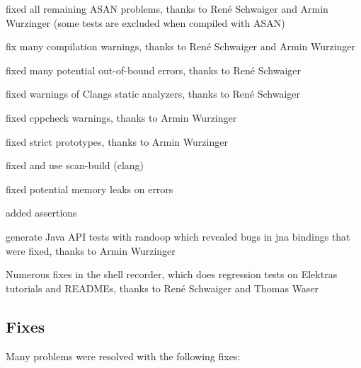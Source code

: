 \begin{DoxyItemize}
\item fixed all remaining A\+S\+AN problems, thanks to René Schwaiger and Armin Wurzinger (some tests are excluded when compiled with A\+S\+AN)
\item fix many compilation warnings, thanks to René Schwaiger and Armin Wurzinger
\item fixed many potential out-\/of-\/bound errors, thanks to René Schwaiger
\item fixed warnings of Clang\textquotesingle{}s static analyzers, thanks to René Schwaiger
\item fixed cppcheck warnings, thanks to Armin Wurzinger
\item fixed strict prototypes, thanks to Armin Wurzinger
\item fixed and use scan-\/build (clang)
\item fixed potential memory leaks on errors
\item added assertions
\item generate Java A\+PI tests with randoop which revealed bugs in jna bindings that were fixed, thanks to Armin Wurzinger
\item Numerous fixes in the shell recorder, which does regression tests on Elektra\textquotesingle{}s tutorials and R\+E\+A\+D\+M\+Es, thanks to René Schwaiger and Thomas Waser
\end{DoxyItemize}

\subsection*{Fixes}

Many problems were resolved with the following fixes\+:


